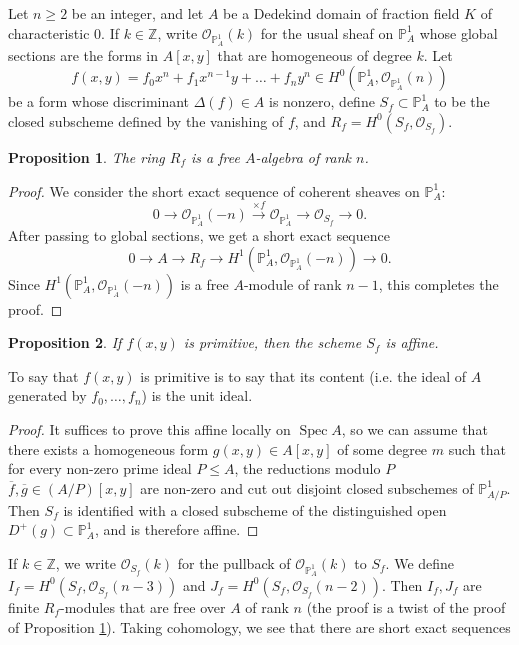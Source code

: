 \documentclass{article} %
\newtheorem{proposition}{Proposition}[section]
\numberwithin{equation}{section}
\DeclareMathOperator{\Spec}{Spec}
\newcommand{\bbP}{\mathbb{P}}
\newcommand{\cO}{\mathcal{O}}
\begin{document}
Let $n \geq 2$ be an integer, and let $A$ be a Dedekind domain of fraction field $K$ of characteristic $0$.
If $k \in \mathbb{Z}$, write $\cO_{\bbP^1_A}(k)$ for the usual sheaf on $\bbP^1_A$ whose global sections are the forms in $A[x, y]$ that are homogeneous of degree $k$.
Let
\[ f(x, y) = f_0 x^n + f_1 x^{n-1} y + \dots + f_n y^n \in H^0(\bbP^1_A, \cO_{\bbP^1_A}(n)) \]
be  a form whose discriminant $\Delta(f) \in A$ is nonzero, define $S_f \subset \mathbb{P}^1_A$ to be the closed subscheme defined by the vanishing of $f$, and $R_f = H^0(S_f, \cO_{S_f})$.
\begin{proposition}\label{prop_R_f_is_free_over_A}
    The ring $R_f$ is a free $A$-algebra of rank $n$. 
\end{proposition}
\begin{proof}
    We consider the short exact sequence of coherent sheaves on $\bbP^1_A$:
    \[ 0 \to \cO_{\bbP^1_A}(-n) \overset{\times f}{\to} \cO_{\bbP^1_A} \to \cO_{S_f} \to 0. \]
    After passing to global sections, we get a short exact sequence
    \[ 0 \to A \to R_f \to H^1(\bbP^1_A, \cO_{\bbP^1_A}(-n)) \to 0. \]
    Since $H^1(\bbP^1_A, \cO_{\bbP^1_A}(-n))$ is a free $A$-module of rank $n-1$, this completes the proof. 
\end{proof}
\begin{proposition}\label{prop_primitive_implies_weierstrass_locus_is_affine}
    If $f(x, y)$ is primitive, then the scheme $S_f$ is affine. 
\end{proposition}
To say that $f(x, y)$ is primitive is to say that its content (i.e. the ideal of $A$ generated by $f_0, \dots, f_n$) is the unit ideal. 
\begin{proof}
    It suffices to prove this affine locally on $\Spec A$, so we can assume that there exists a homogeneous form $g(x, y) \in A[x, y]$ of some degree $m$ such that for every non-zero prime ideal $P \leq A$, the reductions modulo $P$ $\overline{f}, \overline{g} \in (A / P)[x, y]$ are non-zero and cut out disjoint closed subschemes of $\bbP^1_{A / P}$. Then $S_f$ is identified with a closed subscheme of the distinguished open $D^+(g) \subset \bbP^1_A$, and is therefore affine.
\end{proof}
If $k \in \mathbb{Z}$, we write $\cO_{S_f}(k)$ for the pullback of $\cO_{\bbP^1_A}(k)$ to $S_f$. We define $I_f = H^0(S_f, \cO_{S_f}(n-3))$ and $J_f = H^0(S_f, \cO_{S_f}(n-2))$. Then $I_f, J_f$ are finite $R_f$-modules that are free over $A$ of rank $n$ (the proof is a twist of the proof of Proposition \ref{prop_R_f_is_free_over_A}). Taking cohomology, we see that there are short exact sequences
\end{document}
